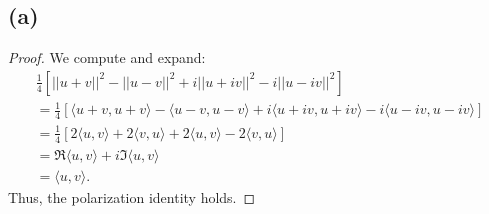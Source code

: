 \documentclass{article}
\begin{document}
\subsection*{(a)}
\begin{proof}
	We compute and expand:
	\begin{align}
		\frac{1}{4}[||u + v||^2 - ||u - v||^2 + i||u + iv||^2 - i ||u - iv||^2] \\= \frac{1}{4}[\langle u+v, u+v\rangle - \langle u-v, u-v\rangle + i\langle u+iv, u+iv\rangle - i\langle u-iv, u-iv\rangle] \\
		= \frac{1}{4}[2\langle u,v\rangle + 2\langle v,u\rangle + 2\langle u,v\rangle - 2\langle v,u\rangle] \\
		= \Re \langle u, v\rangle + i \Im \langle u, v\rangle \\
		= \langle u, v \rangle.
	\end{align}
	Thus, the polarization identity holds.
\end{proof}
\end{document}
